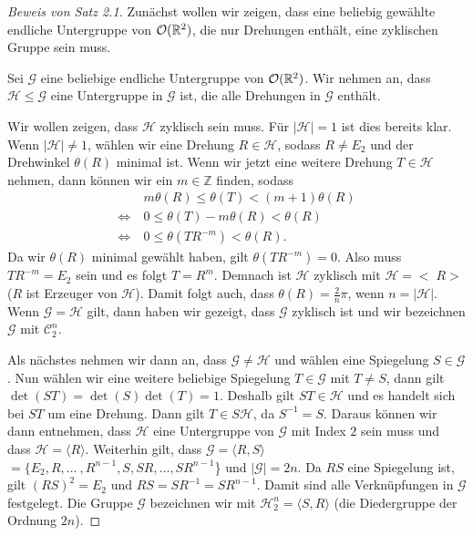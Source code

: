 \begin{proof}[Beweis von Satz 2.1]
	 Zunächst wollen wir zeigen, dass eine beliebig gewählte endliche Untergruppe von ${\mathcal{O}(\mathbb{R}^2)}$, die nur Drehungen enthält, eine zyklischen Gruppe sein muss. \par\smallskip
	 Sei $\mathcal{G}$ eine beliebige endliche Untergruppe von ${\mathcal{O}(\mathbb{R}^2)}$. Wir nehmen an, dass $\mathcal{H} \leq \mathcal{G}$ eine Untergruppe in $\mathcal{G}$ ist, die alle Drehungen in $\mathcal{G}$ enthält.

	 Wir wollen zeigen, dass $\mathcal{H}$ zyklisch sein muss. Für $|\mathcal{H}|=1$ ist dies bereits klar. Wenn $|\mathcal{H}| \neq 1$, wählen wir eine Drehung $R \in \mathcal{H}$, sodass $R \neq E_2$ und der Drehwinkel $\theta(R)$ minimal ist. Wenn wir jetzt eine weitere Drehung $T \in \mathcal{H}$ nehmen, dann können wir ein $m \in \mathbb{Z}$ finden, sodass \begin{align*}
	 &m \theta(R)\leq\theta(T)<(m+1)\theta(R) \\
	 \Leftrightarrow \ &0 \leq \theta(T)-m\theta(R)<\theta(R) \\
	 \Leftrightarrow \ &0 \leq \theta(TR^{-m})<\theta(R).
\end{align*}
	 Da wir $\theta(R)$ minimal gewählt haben, gilt $\theta(TR^{-m})=0$. Also muss $TR^{-m}=E_2$ sein und es folgt $T=R^{m}$. Demnach ist $\mathcal{H}$ zyklisch mit $\mathcal{H}=<\;R\!>$ ($R$ ist Erzeuger von $\mathcal{H}$). Damit folgt auch, dass $\theta(R)=\frac{2}{n}\pi$, wenn $n=|\mathcal{H}|$. Wenn $\mathcal{G} = \mathcal{H}$ gilt, dann haben wir gezeigt, dass $\mathcal{G}$ zyklisch ist und wir bezeichnen $\mathcal{G}$ mit $\mathcal{C}^n_2$.

	 Als nächstes nehmen wir dann an, dass $\mathcal{G} \neq \mathcal{H}$ und wählen eine Spiegelung $S \in \mathcal{G}$. Nun wählen wir eine weitere beliebige Spiegelung $T \in \mathcal{G}$ mit $T \neq S$, dann gilt $\det(ST)=\det(S)\det(T)=1$. Deshalb gilt $ST \in \mathcal{H}$ und es handelt sich bei $ST$ um eine Drehung. Dann gilt $T \in S\mathcal{H}$, da $S^{-1}=S$. Daraus können wir dann entnehmen, dass $\mathcal{H}$ eine Untergruppe von $\mathcal{G}$ mit Index $2$ sein muss und dass $\mathcal{H}=\langle R \rangle$. Weiterhin gilt, dass $\mathcal{G}=\langle R,S \rangle$ $=\{E_2,R,\dots \ ,R^{n-1},S,SR,\dots ,SR^{n-1}$\} und $|\mathcal{G}|=2n$. Da $RS$ eine Spiegelung ist, gilt $(RS)^2=E_2$ und $RS=SR^{-1}=SR^{n-1}$. Damit sind alle Verknüpfungen in $\mathcal{G}$ festgelegt. Die Gruppe $\mathcal{G}$ bezeichnen wir mit $\mathcal{H}^n_2=\langle S,R \rangle$ (die Diedergruppe der Ordnung $2n$).
\end{proof}
